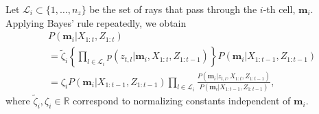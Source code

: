 \documentclass[letterpaper, 10pt, conference]{ieeeconf}
\newcommand{\braces}[1]{\ensuremath{\left\{ #1 \right\}}}
\newcommand{\refeqn}[1]{(\ref{eqn:#1})}
\renewcommand{\Re}{\ensuremath{\mathbb{R}}}
\begin{document}
Let $\mathcal L_i\subset\{1,\ldots, n_z\}$ be the set of rays that pass through the $i$-th cell, $\mathbf{m}_i$. Applying Bayes' rule repeatedly, we obtain
\begin{align}
&P(\mathbf{m}_i|X_{1:t},Z_{1:t})\nonumber\\
&=\tilde\zeta_i\braces{\prod_{l\in\mathcal{L}_i}p(z_{t,l}|\mathbf{m}_i,X_{1:t},Z_{1:t-1})}P(\mathbf{m}_i|X_{1:t-1},Z_{1:t-1})\nonumber\\
%
&=
\zeta_i P(\mathbf{m}_i|X_{1:t-1},Z_{1:t-1})%
\prod_{l\in\mathcal{L}_i}\frac{P(\mathbf{m}_i|z_{t,l},X_{1:t},Z_{1:t-1})}{P(\mathbf{m}_i|X_{1:t-1},Z_{1:t-1})},
\label{eqn:ThirdBayesRule}
\end{align}
where $\tilde\zeta_i,\zeta_i\in\Re$ correspond to normalizing constants independent of $\mathbf{m}_i$. 


\end{document}

